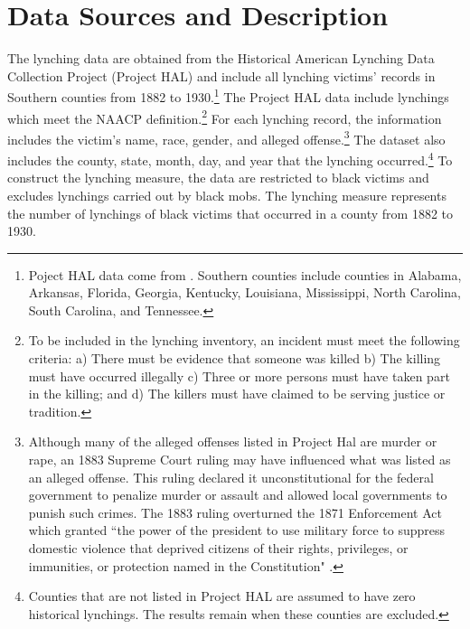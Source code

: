 \documentclass[AEJ, finalmode]{AEA}
\begin{document}
\section{Data Sources and Description}
The lynching data are obtained from the Historical American Lynching Data Collection Project (Project HAL) and include all lynching victims' records in Southern counties from 1882 to 1930.\footnote{Poject HAL data come from . Southern counties include counties in Alabama, Arkansas, Florida, Georgia, Kentucky, Louisiana, Mississippi, North Carolina, South Carolina, and Tennessee.} The Project HAL data include lynchings which meet the NAACP definition.\footnote{To be included in the lynching inventory, an incident must meet the following criteria: a) There must be evidence that someone was killed b) The killing must have occurred illegally c) Three or more persons must have taken part in the killing; and d) The killers must have claimed to be serving justice or tradition.} For each lynching record, the information includes the victim's name, race, gender, and alleged offense.\footnote{Although many of the alleged offenses listed in Project Hal are murder or rape, an 1883 Supreme Court ruling may have influenced what was listed as an alleged offense. This ruling declared it unconstitutional for the federal government to penalize murder or assault and allowed local governments to punish such crimes. The 1883 ruling overturned the 1871 Enforcement Act which granted ``the power of the president to use military force to suppress domestic violence that deprived citizens of their rights, privileges, or immunities, or protection named in the Constitution"  \cite{williams1993south}.} The dataset also includes the county, state, month, day, and year that the lynching occurred.\footnote{Counties that are not listed in Project HAL are assumed to have zero historical lynchings. The results remain when these counties are excluded.} To construct the lynching measure, the data are restricted to black victims and excludes lynchings carried out by black mobs. The lynching measure represents the number of lynchings of black victims that occurred in a county from 1882 to 1930.
\end{document}

